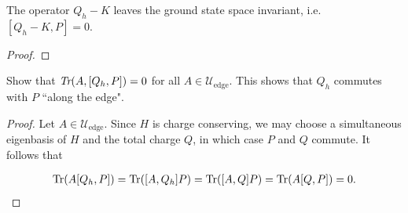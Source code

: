 \documentclass[12pt, letterpaper]{article}
\begin{document}
\begin{proposition}
The operator $Q_h-K$ leaves the ground state space invariant, i.e. $[Q_h-K, P] = 0$.
\end{proposition}
\begin{proof}

\end{proof}


\begin{lemma}
Show that $\emph{Tr}(A,[Q_h,P])=0$ for all $A \in \mathcal{U}_{\text{edge}}$. This shows that $Q_h$ commutes with $P$ ``along the edge".
\label{lemma:[Q,P]=0}
\end{lemma}
\begin{proof}

Let $A \in \mathcal{U}_{\text{edge}}$. Since $H$ is charge conserving, we may choose a simultaneous eigenbasis of $H$ and the total charge $Q$, in which case $P$ and $Q$ commute. It follows that

\[\begin{aligned}
\text{Tr}(A[Q_h, P]) = \text{Tr}([A, Q_h] P) = \text{Tr}([A, Q]P) = \text{Tr}(A[Q,P]) = 0.
\end{aligned}\]







\end{proof}
\end{document}
